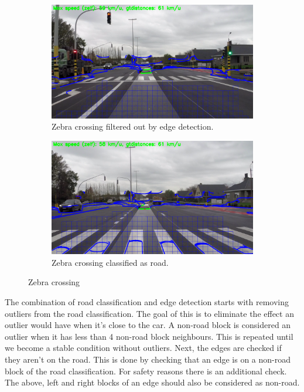 \documentclass[runningheads,a4paper]{llncs}
\begin{document}
\begin{figure}[t]
\centering
\begin{subfigure}[t]{.5\textwidth}
  \centering
  \includegraphics[width=.9\textwidth]{fig/zebra_edge_filtered.png}
  \caption{Zebra crossing filtered out by edge detection.}
\end{subfigure}%
\begin{subfigure}[t]{.5\textwidth}
  \centering
  \includegraphics[width=.9\textwidth]{fig/zebra_road_filtered.png}
  \caption{Zebra crossing classified as road.}
\end{subfigure}
\caption{Zebra crossing\label{zebra}}
\end{figure}

The combination of road classification and edge detection starts with removing outliers from the road classification. The goal of this is to eliminate the effect an outlier would have when it's close to the car. A non-road block is considered an outlier when it has less than 4 non-road block neighbours. This is repeated until we become a stable condition without outliers. 
Next, the edges are checked if they aren't on the road. This is done by checking that an edge is on a non-road block of the road classification. For safety reasons there is an additional check. The above, left and right blocks of an edge should also be considered as non-road. 
\end{document}
